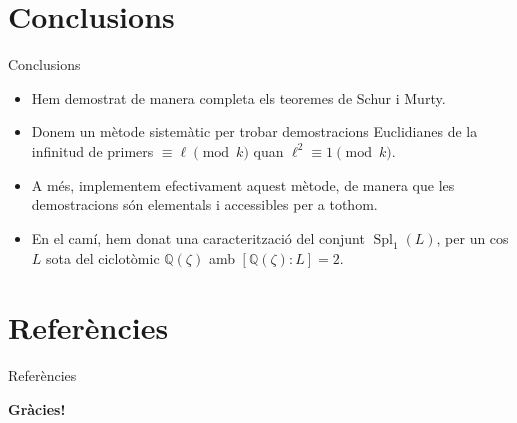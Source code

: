 \documentclass[11pt]{beamer}
\newcommand{\Q}{\ensuremath{\mathbb{Q}}}
\DeclareMathOperator{\Spl}{Spl} %
\begin{document}
	\section{Conclusions}
	\begin{frame}{Conclusions}
		\begin{itemize}
			\item Hem demostrat de manera completa els teoremes de Schur i Murty.\pause
			\item Donem un mètode sistemàtic per trobar demostracions Euclidianes de la infinitud de primers $\equiv\ell\pmod{k}$ quan $\ell^2\equiv 1\pmod{k}$.\pause
			\item A més, implementem efectivament aquest mètode, de manera que les demostracions són elementals i accessibles per a tothom.\pause
			\item En el camí, hem donat una caracterització del conjunt $\Spl_1(L)$, per un cos $L$ sota del ciclotòmic $\Q(\zeta)$ amb $[\Q(\zeta):L]=2$.
		\end{itemize}
	\end{frame}
	
	\section{Referències}
	\begin{frame}[allowframebreaks]{Referències}
		
		
	\end{frame}
	
	\begin{frame}
		\begin{center}
			\vspace{1cm}
			\huge
			\textbf{Gràcies!}
		\end{center}
	\end{frame}
	
\end{document}
